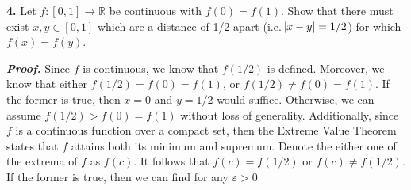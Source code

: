 \documentclass[12pt, a4paper]{article}
\begin{document}
\vspace{2mm}

\noindent\textbf{4.} Let $f\colon[0,1]\rightarrow\mathbb{R}$ be continuous with $f(0)=f(1)$. Show that there must exist $x,y\in[0,1]$ which are a distance of 1/2 apart (i.e. $\abs{x-y}=1/2$) for which $f(x)=f(y)$.

\begin{description}
    \item\textit{\textbf{Proof.}} Since $f$ is continuous, we know that $f(1/2)$ is defined. Moreover, we know that either $f(1/2)=f(0)=f(1)$, or $f(1/2)\neq f(0)=f(1)$. If the former is true, then $x=0$ and $y=1/2$ would suffice. Otherwise, we can assume $f(1/2)>f(0)=f(1)$ without loss of generality. Additionally, since $f$ is a continuous function over a compact set, then the Extreme Value Theorem states that $f$ attains both its minimum and supremum. Denote the either one of the extrema of $f$ as $f(c)$. It follows that $f(c)=f(1/2)$ or $f(c)\neq f(1/2)$. If the former is true, then we can find for any $\varepsilon>0$ 
\end{description}
\end{document}
